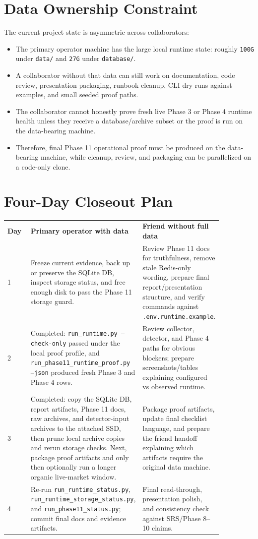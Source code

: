 \documentclass{article}
\begin{document}
\section*{Data Ownership Constraint}
The current project state is asymmetric across collaborators:
\begin{itemize}
\item The primary operator machine has the large local runtime state: roughly \texttt{100G} under \texttt{data/} and \texttt{27G} under \texttt{database/}.
\item A collaborator without that data can still work on documentation, code review, presentation packaging, runbook cleanup, CLI dry runs against examples, and small seeded proof paths.
\item The collaborator cannot honestly prove fresh live Phase 3 or Phase 4 runtime health unless they receive a database/archive subset or the proof is run on the data-bearing machine.
\item Therefore, final Phase 11 operational proof must be produced on the data-bearing machine, while cleanup, review, and packaging can be parallelized on a code-only clone.
\end{itemize}

\section*{Four-Day Closeout Plan}
\begin{longtable}{p{0.12\linewidth}p{0.39\linewidth}p{0.35\linewidth}}
\textbf{Day} & \textbf{Primary operator with data} & \textbf{Friend without full data} \\
1 & Freeze current evidence, back up or preserve the SQLite DB, inspect storage status, and free enough disk to pass the Phase 11 storage guard. & Review Phase 11 docs for truthfulness, remove stale Redis-only wording, prepare final report/presentation structure, and verify commands against \texttt{.env.runtime.example}. \\
2 & Completed: \texttt{run\_runtime.py --check-only} passed under the local proof profile, and \texttt{run\_phase11\_runtime\_proof.py --json} produced fresh Phase 3 and Phase 4 rows. & Review collector, detector, and Phase 4 paths for obvious blockers; prepare screenshots/tables explaining configured vs observed runtime. \\
3 & Completed: copy the SQLite DB, report artifacts, Phase 11 docs, raw archives, and detector-input archives to the attached SSD, then prune local archive copies and rerun storage checks. Next, package proof artifacts and only then optionally run a longer organic live-market window. & Package proof artifacts, update final checklist language, and prepare the friend handoff explaining which artifacts require the original data machine. \\
4 & Re-run \texttt{run\_runtime\_status.py}, \texttt{run\_runtime\_storage\_status.py}, and \texttt{run\_phase11\_status.py}; commit final docs and evidence artifacts. & Final read-through, presentation polish, and consistency check against SRS/Phase 8--10 claims. \\
\end{longtable}
\end{document}
